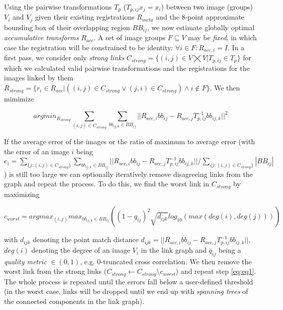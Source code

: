 Using the pairwise transformations $T_{p}$ ($T_{p,ij} x_{j} = x_i$) between two image (groups) $V_i$ and $V_j$ given their existing registrations $R_{meta}$ and the 8-point approximate bounding box of their overlapping region $BB_{ij}$, we now estimate globally optimal \emph{accumulative transforms} $R_{acc}$. A set of image groups $F \subseteq V$ may be \emph{fixed}, in which case the registration will be constrained to be identity: $\forall i \in F: R_{acc,i} = I$. In a first pass, we consider only \emph{strong links} $C_{strong} = \{(i,j) \in V \bigtimes V | T_{p, ij} \in T_p \}$ for which we calculated valid pairwise transformations and the registrations for the images linked by them $R_{strong} = \{r_i \in R_{acc} | ((i,j) \in C_{strong} \vee (j,i) \in C_{strong}) \wedge i \notin F\}$. We then mimimize

\begin{equation}
\label{eq:eq1}
argmin_{R_{strong}} \sum_{(i,j) \in C_{strong}} \sum_{bb_{ij,k} \in BB_{ij}} || R_{acc,i} bb_{ij} - R_{acc,j} T_{p,ij}^{-1} bb_{ij,k} ||^2 
\end{equation}

If the average error of the images or the ratio of maximum to average error (with the error of an image $i$ being $e_i = \sum_{\{j: (i,j) \in C_{strong}\}}  \sum_{bb_{ij,k} \in BB_{ij}} || R_{acc,i} bb_{ij} - R_{acc,j} T_{p,ij}^{-1} bb_{ij,k} || / \sum_{\{j: (i,j) \in C_{strong}\}} |BB_{ij}| $) is still too large we can optionally iteratively remove disagreeing links from the graph and repeat the process. To do this, we find the worst link in $C_{strong}$ by maximizing

\begin{equation}
\label{eq:eq2}
c_{worst} = argmax_{(i,j)} max_{bb_{ij,k} \in BB_{ij}}( (1-q_{ij})^2 \sqrt{d_{ijk}} log_{10}(max(deg(i), deg(j))) ) 
\end{equation}

with $d_{ijk}$ denoting the point match distance $d_{ijk} = || R_{acc,i} bb_{ij} - R_{acc,j} T_{p,ij}^{-1} bb_{ij,k} ||$, $deg(i)$ denoting the degree of an image $V_i$ in the link graph and $q_{ij}$ being a \emph{quality metric} $\in (0,1)$, e.g. 0-truncated cross correlation. We then remove the worst link from the strong links ($C_{strong} \leftarrow C_{strong} \setminus c_{worst}$) and repeat step \ref{eq:eq1}. The whole process is repeated until the errors fall below a user-defined threshold (in the worst case, links will be dropped until we end up with \emph{spanning trees} of the connected components in the link graph). \\

